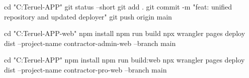 cd "C:\Users\Eliel Teruel\CONTRACTOR-APP"
git status --short
git add .
git commit -m "feat: unified repository and updated deployer"
git push origin main

cd "C:\Users\Eliel Teruel\CONTRACTOR-APP\apps\admin-web"
npm install
npm run build
npx wrangler pages deploy dist --project-name contractor-admin-web --branch main

cd "C:\Users\Eliel Teruel\CONTRACTOR-APP\apps\mobile"
npm install
npm run build:web
npx wrangler pages deploy dist --project-name contractor-pro-web --branch main
